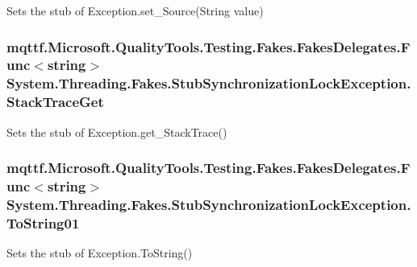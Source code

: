 Sets the stub of Exception.\-set\-\_\-\-Source(\-String value)

\hypertarget{class_system_1_1_threading_1_1_fakes_1_1_stub_synchronization_lock_exception_aa82c4ebfc2c837d970882b134e1b240b}{
\subsubsection[{Stack\-Trace\-Get}]{\setlength{\rightskip}{0pt plus 5cm}mqttf.\-Microsoft.\-Quality\-Tools.\-Testing.\-Fakes.\-Fakes\-Delegates.\-Func$<$string$>$ System.\-Threading.\-Fakes.\-Stub\-Synchronization\-Lock\-Exception.\-Stack\-Trace\-Get}}\label{class_system_1_1_threading_1_1_fakes_1_1_stub_synchronization_lock_exception_aa82c4ebfc2c837d970882b134e1b240b}


Sets the stub of Exception.\-get\-\_\-\-Stack\-Trace()

\hypertarget{class_system_1_1_threading_1_1_fakes_1_1_stub_synchronization_lock_exception_a166216d1c8f63ad38574493f8c9cf70d}{
\subsubsection[{To\-String01}]{\setlength{\rightskip}{0pt plus 5cm}mqttf.\-Microsoft.\-Quality\-Tools.\-Testing.\-Fakes.\-Fakes\-Delegates.\-Func$<$string$>$ System.\-Threading.\-Fakes.\-Stub\-Synchronization\-Lock\-Exception.\-To\-String01}}\label{class_system_1_1_threading_1_1_fakes_1_1_stub_synchronization_lock_exception_a166216d1c8f63ad38574493f8c9cf70d}


Sets the stub of Exception.\-To\-String()



